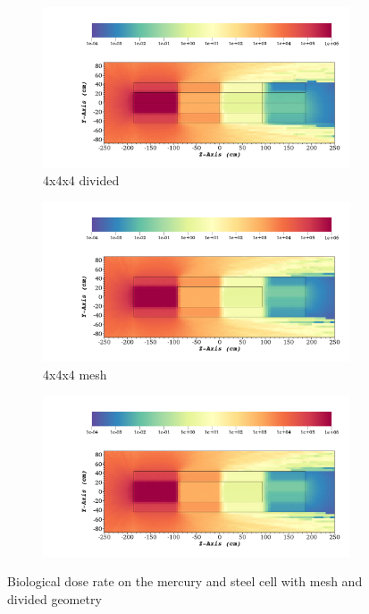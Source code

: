 \begin{figure}[H]
	\begin{subfigure}[t]{0.5\textwidth}
		\includegraphics[width=\linewidth, trim={8cm 2cm 2cm 10cm},clip]{../figs/toy_p2/dose_VPII_4x_split.png}
		\caption{4x4x4 divided}
		\label{fig:2dose_4x_split}
	\end{subfigure}\hfill
	\begin{subfigure}[t]{0.5\textwidth}
		\includegraphics[width=\linewidth, trim={8cm 2cm 2cm 10cm},clip]{../figs/toy_p2/dose_VPII_4x_mesh.png}
		\caption{4x4x4 mesh}
		\label{fig:2dose_4x_mesh}
	\end{subfigure}

	\begin{subfigure}[t]{1.0\textwidth}
		\centering
		\includegraphics[width=\linewidth, trim={8cm 26cm 2cm 2cm},clip]{../figs/toy_p2/dose_VPII_4x_mesh.png}
		\label{fig:2legend}
	\end{subfigure}
	\caption{Biological dose rate on the mercury and steel cell with mesh and divided geometry}
	\label{fig:2dose}
\end{figure}

